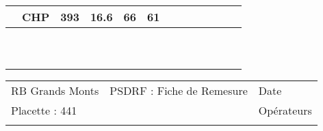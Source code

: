 \documentclass[a4paper, landscape]{article}\usepackage[]{graphicx}\usepackage[]{color}
\begin{document}
{\begin{tabular}{|p{1cm}|p{2cm}|p{1.6cm}|p{1.6cm}|p{1.6cm}|p{1.6cm}|p{1.5cm}|p{1.5cm}|p{1.5cm}|p{1.5cm}|p{1.5cm}|p{7.5cm}|p{5cm}|}
   \rowcolor[gray]{0.95} \hline
20 & CHP & 393 & 16.6 & 66 & 61 &  &  &  &  &  &  &  \\ 
   \hline
 &  &  &  &  &  &  &  &  &  &  &  &  \\ 
   \rowcolor[gray]{0.95} \hline
 &  &  &  &  &  &  &  &  &  &  &  &  \\ 
   \hline
 &  &  &  &  &  &  &  &  &  &  &  &  \\ 
   \rowcolor[gray]{0.95} \hline
 &  &  &  &  &  &  &  &  &  &  &  &  \\ 
   \hline
 &  &  &  &  &  &  &  &  &  &  &  &  \\ 
   \rowcolor[gray]{0.95} \hline
 &  &  &  &  &  &  &  &  &  &  &  &  \\ 
   \hline
 &  &  &  &  &  &  &  &  &  &  &  &  \\ 
   \rowcolor[gray]{0.95} \hline
 &  &  &  &  &  &  &  &  &  &  &  &  \\ 
   \hline
 &  &  &  &  &  &  &  &  &  &  &  &  \\ 
   \rowcolor[gray]{0.95} \hline
 &  &  &  &  &  &  &  &  &  &  &  &  \\ 
   \hline
\end{tabular}
}

\begin{tabular}{p{10cm}p{10cm}p{8cm}}
  RB Grands Monts & PSDRF : Fiche de Remesure & Date \\ 
  Placette : 441 &  & Opérateurs \\ 
   &  &  \\ 
  \end{tabular}
\end{document}
